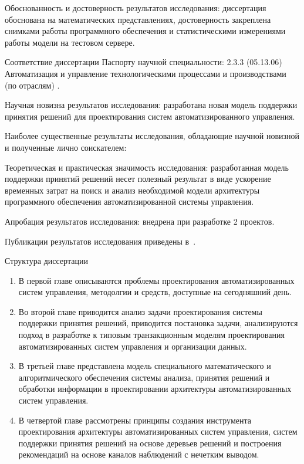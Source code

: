 Обоснованность и достоверность результатов исследования: диссертация обоснована на математических представлениях, достоверность закреплена снимками работы программного обеспечения и статистическими измерениями работы модели на тестовом сервере.

Соответствие диссертации Паспорту научной специальности: 2.3.3 (05.13.06) Автоматизация и управление технологическими процессами и производствами (по отраслям) .

Научная новизна результатов исследования: разработана новая модель поддержки принятия решений для проектирования систем автоматизированного управления.

Наиболее существенные результаты исследования, обладающие научной новизной и полученные лично соискателем:

Теоретическая и практическая значимость исследования: разработанная модель поддержки принятий решений несет полезный результат в виде ускорение временных затрат на поиск и анализ необходимой модели архитектуры программного обеспечения автоматизированной системы управления.

Апробация результатов исследования: внедрена при разработке 2 проектов. 

Публикации результатов исследования приведены в~\cite{aaij2022searches, baptista2021angular, leite2021observation,baptista2021searches,collaboration2021measurement,baptista2021measurement,aaij2021precision,aaij2022identification,bediaga2020measurement, aaij2021constraints,   onderwater2020study, aaij2022arxiv,     aaij2019arxiv,aaij2021evidence,aaij2020aps,baptista2021observation,baptista2021search,aaij2020isospin,  aaij2019precision,aaij2019search, lhcb2108evidence,aaij2022study,         aaij2022first,aaij2022j,  aaij2022observation, aaij2022tests}.


Структура диссертации
\begin{enumerate}
\item В первой главе описываются проблемы проектирования автоматизированных систем управления, методолгии и средств, доступные на сегодняшний день.
\item Во второй главе приводится анализ задачи проектирования системы поддержки принятия решений, приводится постановка задачи, анализируются подход в разработке к типовым транзакционным моделям проектирования автоматизированных систем управления и организации данных.
\item В третьей главе представлена  модель специального математического и алгоритмического обеспечения системы анализа, принятия решений и обработки информации в проектировании архитектуры автоматизированных систем управления.
\item В четвертой главе рассмотрены принципы создания инструмента проектирования архитектуры автоматизированных систем управления, систем поддержки принятия решений на основе деревьев решений и построения рекомендаций на основе каналов наблюдений с нечетким выводом.
\end{enumerate}



